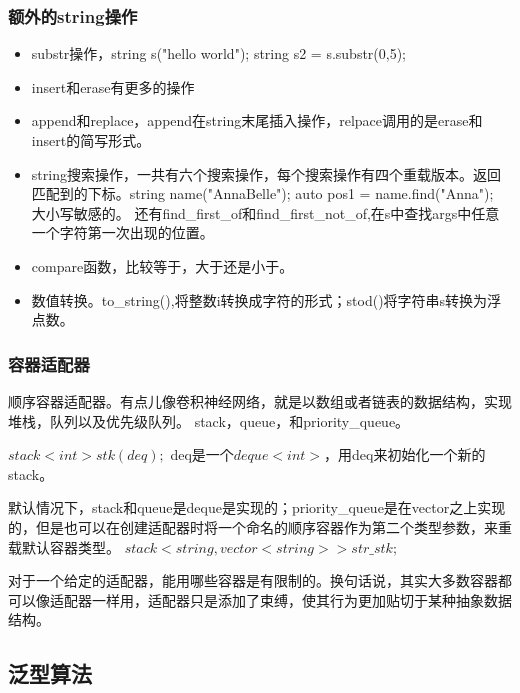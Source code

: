 \subsubsection{额外的string操作}
\begin{itemize}
	\item substr操作，string s("hello world"); string s2 = s.substr(0,5);
	\item insert和erase有更多的操作
	\item append和replace，append在string末尾插入操作，relpace调用的是erase和insert的简写形式。
	\item string搜索操作，一共有六个搜索操作，每个搜索操作有四个重载版本。返回匹配到的下标。string name("AnnaBelle"); auto pos1 = name.find("Anna"); 大小写敏感的。
	还有find\_first\_of和find\_first\_not\_of,在s中查找args中任意一个字符第一次出现的位置。
	\item compare函数，比较等于，大于还是小于。
	\item 数值转换。to\_string(),将整数i转换成字符的形式；stod()将字符串s转换为浮点数。
\end{itemize}

\subsubsection{容器适配器}
顺序容器适配器。有点儿像卷积神经网络，就是以数组或者链表的数据结构，实现堆栈，队列以及优先级队列。 stack，queue，和priority\_queue。

$stack<int> stk(deq);$ deq是一个$deque<int>$，用deq来初始化一个新的stack。

默认情况下，stack和queue是deque是实现的；priority\_queue是在vector之上实现的，但是也可以在创建适配器时将一个命名的顺序容器作为第二个类型参数，来重载默认容器类型。
$stack<string,vector<string>> str\_stk;$

对于一个给定的适配器，能用哪些容器是有限制的。换句话说，其实大多数容器都可以像适配器一样用，适配器只是添加了束缚，使其行为更加贴切于某种抽象数据结构。

\subsection{泛型算法}


